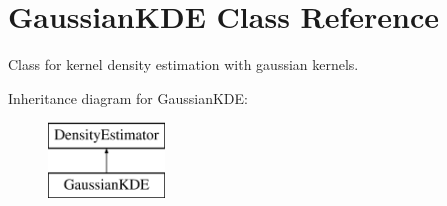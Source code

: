 \section{Gaussian\+K\+DE Class Reference}
\label{classPecos_1_1GaussianKDE}


Class for kernel density estimation with gaussian kernels.  


Inheritance diagram for Gaussian\+K\+DE\+:\begin{figure}[H]
\begin{center}
\leavevmode
\includegraphics[height=2.000000cm]{classPecos_1_1GaussianKDE}
\end{center}
\end{figure}
